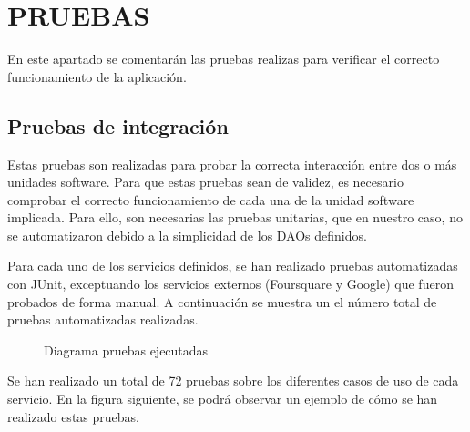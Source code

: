 \chapter[Pruebas]{
  \label{chp:pruebas}
  PRUEBAS
}
\thispagestyle{numberingStyle}
\pagestyle{numberingStyle}

En este apartado se comentarán las pruebas realizas para verificar el correcto funcionamiento de la aplicación.



\section{Pruebas de integración}
Estas pruebas son realizadas para probar la correcta interacción entre dos o más unidades software. Para que estas pruebas sean de validez, es necesario comprobar el correcto funcionamiento de cada una de la unidad software implicada. Para ello, son necesarias las pruebas unitarias, que en nuestro caso, no se automatizaron debido a la simplicidad de los DAOs definidos.

Para cada uno de los servicios definidos, se han realizado pruebas automatizadas con JUnit, exceptuando los servicios externos (Foursquare y Google) que fueron probados de forma manual. A continuación se muestra un el número total de pruebas automatizadas realizadas.

\begin{figure}[H]
\centering
{}
\caption{Diagrama pruebas ejecutadas}
\end{figure}

Se han realizado un total de 72 pruebas sobre los diferentes casos de uso de cada servicio. En la figura siguiente, se podrá observar un ejemplo de cómo se han realizado estas pruebas.

